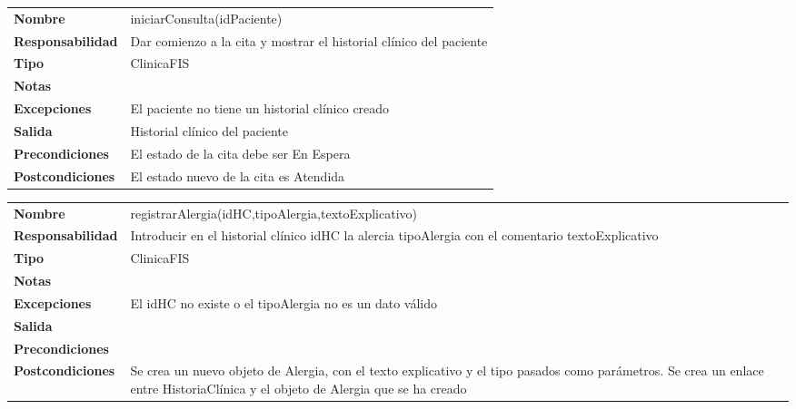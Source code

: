 \begin{table}[htbp]
	  \begin{tabularx}{\textwidth}{l|l}
    \textbf{Nombre}        & iniciarConsulta(idPaciente) \\ 
    \textbf{Responsabilidad}  & Dar comienzo a la cita y mostrar el historial clínico del paciente \\ 
    \textbf{Tipo}        &  ClinicaFIS\\ 
    \textbf{Notas}        &  \\ 
    \textbf{Excepciones}    & El paciente no tiene un historial clínico creado \\ 
    \textbf{Salida}        & Historial clínico del paciente \\ 
    \textbf{Precondiciones}    & El estado de la cita debe ser En Espera \\ 
    \textbf{Postcondiciones}  &  El estado nuevo de la cita es Atendida\\ 
  \end{tabularx}

\end{table}


\begin{table}[htbp]
	  \begin{tabularx}{\textwidth}{l|l}
    \textbf{Nombre}        & registrarAlergia(idHC,tipoAlergia,textoExplicativo) \\ 
    \textbf{Responsabilidad}  & Introducir en el historial clínico idHC la alercia tipoAlergia con el comentario textoExplicativo \\ 
    \textbf{Tipo}        & ClinicaFIS \\ 
    \textbf{Notas}        &  \\ 
    \textbf{Excepciones}    & El idHC no existe o el tipoAlergia no es un dato válido \\ 
    \textbf{Salida}        &  \\ 
    \textbf{Precondiciones}    &  \\ 
    \textbf{Postcondiciones}  &  Se crea un nuevo objeto de Alergia, con el texto explicativo y el tipo pasados como parámetros.
    Se crea un enlace  entre HistoriaClínica y el objeto de Alergia que se ha creado \\ 
  \end{tabularx}

\end{table}


